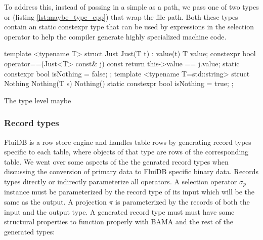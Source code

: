 To address this, instead of passing in a simple  as a
path, we pass one of two types  or  (listing
\ref{lst:maybe_type_cpp}) that wrap the file path. Both these types
contain an  static constexpr type that can be used by
 expressions in the selection operator to help
the compiler generate highly specialized machine code.

\begin{code}
\begin{cppcode}
template <typename T>
struct Just {
  Just(T t) : value(t) {}
  T value;
  constexpr bool operator==(Just<T> const& j) const {
    return this->value == j.value;
  }
  static constexpr bool isNothing = false;
};
template <typename T=std::string>
struct Nothing {
  Nothing(T s) {}
  Nothing() {}
  static constexpr bool isNothing = true;
};
\end{cppcode}
\caption{\label{lst:maybe_type_cpp}The type level maybe}
\end{code}

\subsubsection{Record types}

FluiDB is a row store engine and handles table rows by generating
record types specific to each table, where objects of that type are
rows of the corresponding table. We went over some aspects of the the
genrated record types when discussing the conversion of primary data
to FluiDB specific binary data. Records types directly or indirectly
parameterize all operators. A selection operator \(\sigma_p\) instance
must be parameterized by the record type of its input which will be
the same as the output. A projection \(\pi\) is parameterized by the
records of both the input and the output type. A generated record type
must must have some structural properties to function properly with
BAMA and the rest of the generated types:

